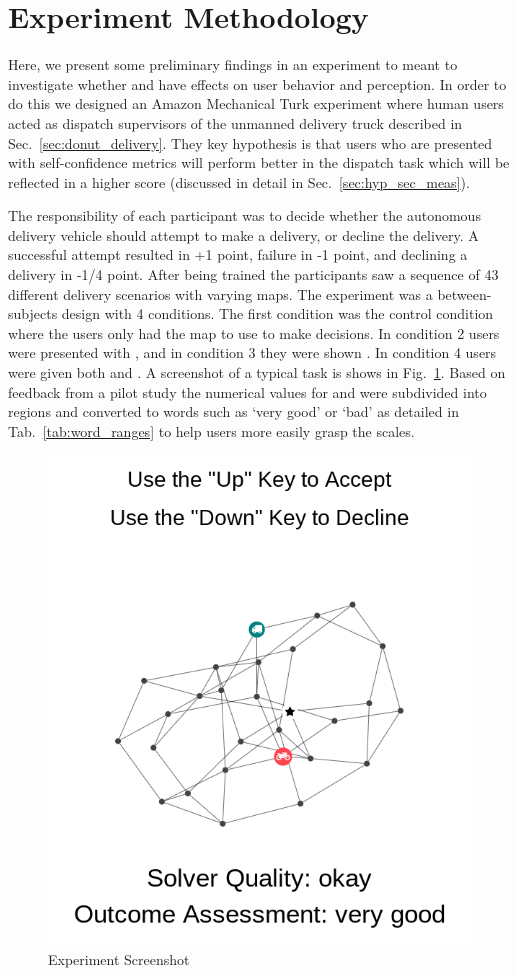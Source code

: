 \section{Experiment Methodology} \label{sec:methodology}
    Here, we present some preliminary findings in an experiment to meant to investigate whether \xQ{} and \xO{} have effects on user behavior and perception. In order to do this we designed an Amazon Mechanical Turk experiment where human users acted as dispatch supervisors of the unmanned delivery truck described in Sec.~\ref{sec:donut_delivery}. They key hypothesis is that users who are presented with self-confidence metrics will perform better in the dispatch task which will be reflected in a higher score (discussed in detail in Sec.~\ref{sec:hyp_sec_meas}).

    The responsibility of each participant was to decide whether the autonomous delivery vehicle should attempt to make a delivery, or decline the delivery. A successful attempt resulted in +1 point, failure in -1 point, and declining a delivery in -1/4 point. After being trained the participants saw a sequence of 43 different delivery scenarios with varying maps. The experiment was a between-subjects design with 4 conditions. The first condition was the control condition where the users only had the map to use to make decisions. In condition 2 users were presented with \xQ{}, and in condition 3 they were shown \xP{}. In condition 4 users were given both \xQ{} and \xP. A screenshot of a typical task is shows in Fig.~\ref{fig:screenshot}. Based on feedback from a pilot study the numerical values for \xQ{} and \xP{} were subdivided into regions and converted to words such as `very good' or `bad' as detailed in Tab.~\ref{tab:word_ranges} to help users more easily grasp the scales.

       \begin{figure}[tb]
            \centering
            \includegraphics[width=0.8\linewidth]{Figures/experiment_screenshot}
            \caption{Experiment Screenshot}
            \label{fig:screenshot}
        \end{figure}

